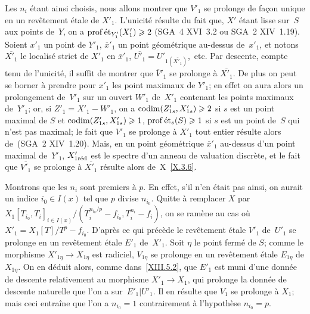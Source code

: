 Les $n_{i}$ \'etant ainsi choisis, nous allons montrer que $V'_{1}$
se prolonge de fa\c con unique en un rev\^etement \'etale de
$X'_{1}$. L'unicit\'e r\'esulte du fait que, $X'$ \'etant lisse
sur~$S$ aux points de~$Y$, on a $\operatorname{prof}\mathrm{\acute{e}t}_{Y'_{1}}(X'_{1})\geqslant 2$
(SGA~4 XVI~3.2 ou SGA~2 XIV~1.19). Soient $x'_{1}$ un point de
$Y'_{1}$, $\overline{x}'_{1}$ un point g\'eom\'etrique au-dessus
de~$x'_{1}$, et notons $\overline{X'_{1}}$ le localis\'e strict de
$X'_{1}$ en $\overline{x}'_{1}$,
$\overline{U'_{1}}=U'_{1(\overline{X'_{1}})}$,~etc. Par descente,
compte tenu de l'unicit\'e, il suffit de montrer que
$\overline{V}'_{1}$ se prolonge \`a $\overline{X'_{1}}$. De plus on
peut se borner \`a prendre pour $x'_{1}$ les point maximaux de
$Y'_{1}$; en effet on aura alors un prolongement de~$V'_{1}$ sur un
ouvert $W'_{1}$ de~$X'_{1}$ contenant les points maximaux de~$Y'_{1}$;
or, si $Z'_{1}=X'_{1}- W'_{1}$, on a
$\operatorname{codim}(Z'_{1s},X'_{1s})\geqslant 2$ si $s$ est un point maximal de
$S$ et $\operatorname{codim}(Z'_{1s},X'_{1s})\geqslant 1$, $\operatorname{prof}\mathrm{\acute{e}t}_{s}(S)\geqslant
1$ si $s$ est un point de~$S$ qui n'est pas maximal; le fait que
$V'_{1}$ se prolonge \`a $X'_{1}$ tout entier r\'esulte alors
de~(SGA~2 XIV~1.20). Mais, en un point g\'eom\'etrique
$\overline{x}'_{1}$ au-dessus d'un point maximal de~$Y'_{1}$,
$X'_{1\mathrm{r\acute{e}d}}$ est le spectre d'un anneau de valuation discr\`ete, et
le fait que $\overline{V'_{1}}$ se prolonge \`a $\overline{X'_{1}}$
r\'esulte alors de~X~\ref{X.3.6}.

Montrons que les $n_{i}$ sont premiers \`a $p$. En effet, s'il n'en
\'etait pas ainsi, on aurait un indice $i_{0}\in I(x)$ tel que $p$
divise $n_{i_{0}}$. Quitte \`a remplacer $X$ par
$X_{1}[T_{i_{0}},T_{i}]_{i\in I(x)}\big/
(T_{i}^{n_{i_{0}}/p}-f_{i_{0}},T_{i}^{n_{i}}-f_{i})$, on se ram\`ene
au cas o\`u $X'_{1}=X_{1}[T]/T^{p}-f_{i_{0}}$. D'apr\`es ce qui
pr\'ec\`ede le rev\^etement
\'etale $V'_{1}$ de~$U'_{1}$ se prolonge en un rev\^etement
\'etale $E'_{1}$ de~$X'_{1}$. Soit $\eta$ le point ferm\'e de
$S$; comme le morphisme $X'_{1\eta}\to X_{1\eta}$ est radiciel,
$V_{1\eta}$ se prolonge en un rev\^etement \'etale $E_{1\eta}$ de
$X_{1\eta}$. On en d\'eduit alors, comme dans~\ref{XIII.5.2}, que
$E'_{1}$ est muni d'une donn\'ee de descente relativement au
morphisme $X'_{1}\to X_{1}$, qui prolonge la donn\'ee de descente
naturelle que l'on a sur~$E'_{1}|U'_{1}$. Il en r\'esulte que
$V_{1}$ se prolonge \`a $X_{1}$; mais ceci entra\^ine que l'on a
$n_{i_{0}}=1$ contrairement \`a l'hypoth\`ese $n_{i_{0}}=p$.

